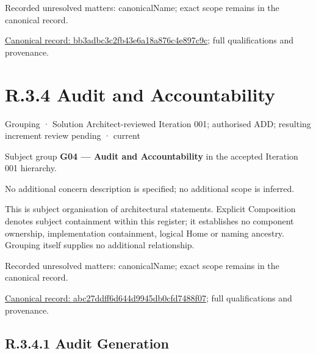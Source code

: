 {\small Recorded unresolved matters: canonicalName; exact scope remains in the canonical record.}\par
{\footnotesize \href{../../../../continuum/grouping/bb3adbc3c2fb43e6a18a876c4e897c9c.md}{Canonical record: bb3adbc3c2fb43e6a18a876c4e897c9c}; full qualifications and provenance.}\par
\section*{R.3.4 Audit and Accountability}
\label{navigation:R.3.4}

\label{element:abc27ddff6d644d9945db0cfd7488f07}
{\small Grouping · Solution Architect-reviewed Iteration 001; authorised ADD; resulting increment review pending · current}\par

Subject group \textbf{G04 — Audit and Accountability} in the accepted Iteration 001 hierarchy.



No additional concern description is specified; no additional scope is inferred.



This is subject organisation of architectural statements. Explicit Composition denotes subject containment within this register; it establishes no component ownership, implementation containment, logical Home or naming ancestry. Grouping itself supplies no additional relationship.


{\small Recorded unresolved matters: canonicalName; exact scope remains in the canonical record.}\par
{\footnotesize \href{../../../../continuum/grouping/abc27ddff6d644d9945db0cfd7488f07.md}{Canonical record: abc27ddff6d644d9945db0cfd7488f07}; full qualifications and provenance.}\par
\subsection*{R.3.4.1 Audit Generation}
\label{navigation:R.3.4.1}

